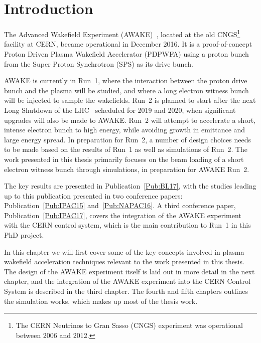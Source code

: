 %
%

\chapter{Introduction}
\label{Ch:Intro}

The Advanced Wakefield Experiment (AWAKE)~\cite{awake_collaboration:2014}, located at the old CNGS\footnote{The CERN Neutrinos to Gran Sasso (CNGS) experiment was operational between 2006 and 2012.} facility at CERN, became operational in December 2016.
It is a proof-of-concept Proton Driven Plasma Wakefield Accelerator (PDPWFA) using a proton bunch from the Super Proton Synchrotron (SPS) as its drive bunch.

AWAKE is currently in Run~1, where the interaction between the proton drive bunch and the plasma will be studied, and where a long electron witness bunch will be injected to sample the wakefields.
Run~2 is planned to start after the next Long Shutdown of the LHC~\cite{bernardini:2016} scheduled for 2019 and 2020, when significant upgrades will also be made to AWAKE.
Run~2 will attempt to accelerate a short, intense electron bunch to high energy, while avoiding growth in emittance and large energy spread.
In preparation for Run~2, a number of design choices needs to be made based on the results of Run~1 as well as simulations of Run~2.
The work presented in this thesis primarily focuses on the beam loading of a short electron witness bunch through simulations, in preparation for AWAKE Run~2.

The key results are presented in Publication~\ref{Pub:BL17}, with the studies leading up to this publication presented in two conference papers: Publication~\ref{Pub:IPAC15} and~\ref{Pub:NAPAC16}.
A third conference paper, Publication~\ref{Pub:IPAC17}, covers the integration of the AWAKE experiment with the CERN control system, which is the main contribution to Run~1 in this PhD project.

In this chapter we will first cover some of the key concepts involved in plasma wakefield acceleration techniques relevant to the work presented in this thesis.
The design of the AWAKE experiment itself is laid out in more detail in the next chapter, and the integration of the AWAKE experiment into the CERN Control System is described in the third chapter.
The fourth and fifth chapters outlines the simulation works, which makes up most of the thesis work.

